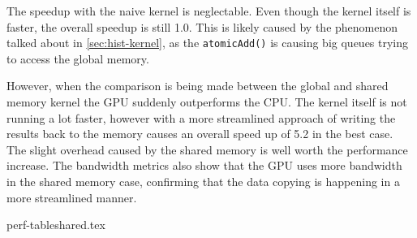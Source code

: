 \documentclass[final]{report}
\begin{document}
The speedup with the naive kernel is neglectable.
Even though the kernel itself is faster, the overall speedup is still 1.0.
This is likely caused by the phenomenon talked about in \cref{sec:hist-kernel}, as the \texttt{atomicAdd()} is causing big queues trying to access the global memory.

However, when the comparison is being made between the global and shared memory kernel the GPU suddenly outperforms the CPU.
The kernel itself is not running a lot faster, however with a more streamlined approach of writing the results back to the memory causes an overall speed up of 5.2 in the best case.
The slight overhead caused by the shared memory is well worth the performance increase.
The bandwidth metrics also show that the GPU uses more bandwidth in the shared memory case, confirming that the data copying is happening in a more streamlined manner.

{perf-tableshared.tex}
\end{document}
